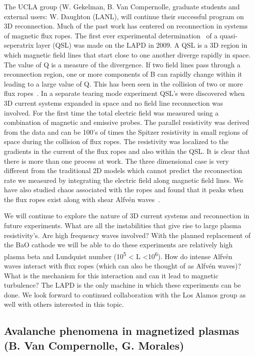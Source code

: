 \documentclass[11pt]{article}
\renewcommand{\cite}{\citep}
\begin{document}
The UCLA group (W. Gekelman, B. Van Compernolle, graduate students and
external users: W. Daughton (LANL), will continue their successful
program on 3D reconnection. Much of the past work has centered on
reconnection in systems of magnetic flux ropes. The first ever
experimental determination~\cite{lawrence:2009} of a quasi-seperatrix
layer (QSL) was made on the LAPD in 2009. A QSL is a 3D region in
which magnetic field lines that start close to one another diverge
rapidly in space. The value of Q is a measure of the divergence.  If
two field lines pass through a reconnection region, one or more
components of B can rapidly change within it leading to a large value
of Q. This has been seen in the collision of two or more flux
ropes~\cite{gekelman:2010}. In a separate tearing mode experiment
QSL's were discovered when 3D current systems expanded in space and no
field line reconnection was involved. For the first time the total
electric field was measured using a combination of magnetic and
emissive probes. The parallel resistivity was derived from the data
and can be 100's of times the Spitzer resistivity in small regions of
space during the collision of flux ropes. The resistivity was
localized to the gradients in the current of the flux ropes and also
within the QSL. It is clear that there is more than one process at
work. The three dimensional case is very different from the
traditional 2D models which cannot predict the reconnection rate we
measured by integrating the electric field along magnetic field
lines. We have also studied chaos associated with the
ropes and found that it peaks when the
flux ropes exist along with shear Alfvén waves~\cite{gekelman:2014}.

We will continue to explore the nature of 3D current systems and
reconnection in future experiments. What are all the instabilities that
give rise to large plasma resistivity's. Are high frequency waves
involved? With the planned replacement of the BaO cathode we will be
able to do these experiments are relatively high plasma beta and Lundquist number
(10\textsuperscript{5} \textless{} L \textless{}10\textsuperscript{6}).
How do intense Alfvén waves interact with flux ropes (which can also be
thought of as Alfvén waves)? What is the mechanism for this interaction
and can it lead to magnetic turbulence? The LAPD is the only machine in
which these experiments can be done. We look forward to continued
collaboration with the Los Alamos group as well with others interested
in this topic.

\subsection{Avalanche phenomena in magnetized plasmas (B. Van Compernolle, G.
Morales)}
\end{document}
